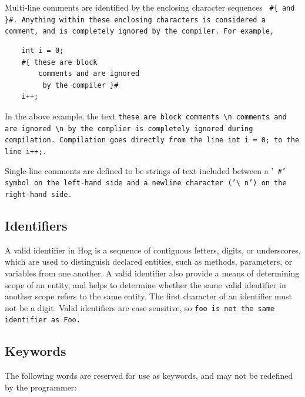 \documentclass{book}
\begin{document}
Multi-line comments are identified by the enclosing character sequences \tt
\#\{ \rm and \tt \}\#\rm. Anything within these enclosing characters is
considered a comment, and is completely ignored by the compiler. For example,

\begin{verbatim}
    int i = 0;
    #{ these are block
        comments and are ignored
         by the compiler }#
    i++;

\end{verbatim}

In the above example, the text \tt these are block comments \textbackslash n
comments and are ignored \textbackslash n by the complier \rm is completely
ignored during compilation. Compilation goes directly from the line \tt int i =
0; \rm to the line \tt i++;\rm.

Single-line comments are defined to be strings of text included between a '\tt
\#\rm' symbol on the left-hand side and a newline character ('\tt\textbackslash
n\rm') on the right-hand side.


\subsection{Identifiers} %
\label{sub:identifiers}

A valid identifier in Hog is a sequence of contiguous letters, digits, or
underscores, which are used to distinguish declared entities, such as methods,
parameters, or variables from one another. A valid identifier also provide a
means of determining scope of an entity, and helps to determine whether the
same valid identifier in another scope refers to the same entity. The first
character of an identifier must not be a digit. Valid identifiers are case
sensitive, so \tt foo \rm is not the same identifier as \tt Foo\rm.


\subsection{Keywords} %
\label{sub:keywords}

The following words are reserved for use as keywords, and may not be redefined
by the programmer:
\end{document}
